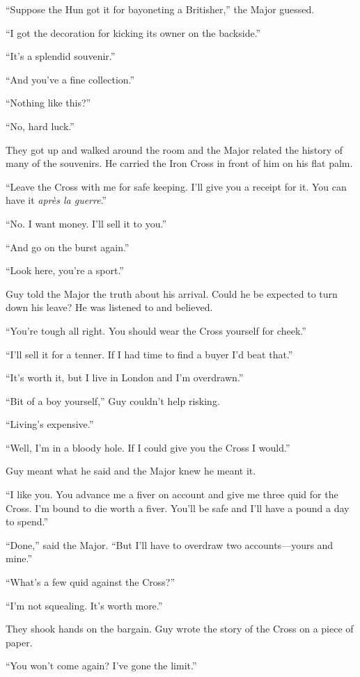 ``Suppose the Hun got it for bayoneting a Britisher,'' the Major guessed.

``I got the decoration for kicking its owner on the backside.''

``It's a splendid souvenir.''

``And you've a fine collection.''

``Nothing like this?''

``No, hard luck.''

They got up and walked around the room and the Major related the history of many of the souvenirs. He carried the Iron Cross in front of him on his flat palm.

``Leave the Cross with me for safe keeping. I'll give you a receipt for it. You can have it \emph{apr\`{e}s la guerre}.''

``No. I want money. I'll sell it to you.''

``And go on the burst again.''

``Look here, you're a sport.''

Guy told the Major the truth about his arrival. Could he be expected to turn down his leave? He was listened to and believed.

``You're tough all right. You should wear the Cross yourself for cheek.''

``I'll sell it for a tenner. If I had time to find a buyer I'd beat that.''

``It's worth it, but I live in London and I'm overdrawn.''

``Bit of a boy yourself,'' Guy couldn't help risking.

``Living's expensive.''

``Well, I'm in a bloody hole. If I could give you the Cross I would.''

Guy meant what he said and the Major knew he meant it.

``I like you. You advance me a fiver on account and give me three quid for the Cross. I'm bound to die worth a fiver. You'll be safe and I'll have a pound a day to spend.''

``Done,'' said the Major. ``But I'll have to overdraw two accounts---yours and mine.''

``What's a few quid against the Cross?''

``I'm not squealing. It's worth more.''

They shook hands on the bargain. Guy wrote the story of the Cross on a piece of paper.

``You won't come again? I've gone the limit.''

